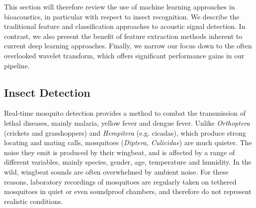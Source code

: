 \documentclass[10pt, twocolumn]{llncs}
\newcommand{\dzN}[1]{\todo[inline, size=\small, color=yellow!30]{[dz] #1}}
\begin{document}
This section will therefore review the use of machine learning approaches in bioacoustics, in particular with respect to insect recognition. We describe the traditional feature and classification approaches to acoustic signal detection. In contrast, we also present the benefit of feature extraction methods inherent to current deep learning approaches. Finally, we narrow our focus down to the often overlooked wavelet transform, which offers significant performance gains in our pipeline.


\subsection{Insect Detection}
\label{subsec:InsectDetect}
Real-time mosquito detection provides a method to combat the transmission of lethal diseases, mainly malaria, yellow fever and dengue fever. Unlike \textit{Orthoptera} (crickets and grasshoppers) and \textit{Hempitera} (e.g. cicadas), which produce strong locating and mating calls, mosquitoes (\textit{Diptera, Culicidae}) are much quieter. The noise they emit is produced by their wingbeat, and is affected by a range of different variables, mainly species, gender, age, temperature and humidity. In the wild, wingbeat sounds are often overwhelmed by ambient noise. For these reasons, laboratory recordings of mosquitoes are regularly taken on tethered mosquitoes in quiet or even soundproof chambers, and therefore do not represent realistic conditions. 
\end{document}
